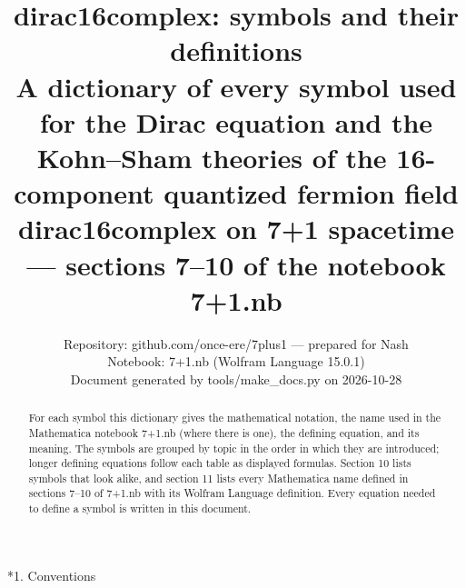 \documentclass[10pt,a4paper]{article}
\makeatletter
\renewcommand\section{\@startsection{section}{1}{\z@}{-3.5ex \@plus -1ex \@minus -.2ex}{2.3ex \@plus.2ex}{\normalfont\Large\bfseries\raggedright}}
\makeatother
\begin{document}
\title{dirac16complex: symbols and their definitions\\[0.4em]\large A dictionary of every symbol used for the Dirac equation and the Kohn–Sham theories of the 16-component quantized fermion field dirac16complex on 7+1 spacetime — sections 7–10 of the notebook 7+1.nb}
\author{Repository: github.com/once-ere/7plus1 — prepared for Nash\\ Notebook: 7+1.nb (Wolfram Language 15.0.1)\\ Document generated by tools/make\_docs.py on 2026-10-28}
\date{}
\maketitle
\begin{abstract}
For each symbol this dictionary gives the mathematical notation, the name used in the Mathematica notebook 7+1.nb (where there is one), the defining equation, and its meaning. The symbols are grouped by topic in the order in which they are introduced; longer defining equations follow each table as displayed formulas. Section 10 lists symbols that look alike, and section 11 lists every Mathematica name defined in sections 7–10 of 7+1.nb with its Wolfram Language definition. Every equation needed to define a symbol is written in this document.
\end{abstract}
\tableofcontents
{}\section*{1. Conventions}
\end{document}
